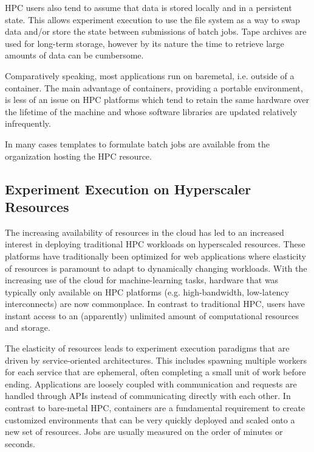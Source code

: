 \documentclass[utf8]{FrontiersinVancouver} %
\begin{document}
HPC users also tend to assume that data is stored locally and in a persistent state. This allows experiment execution to use the file system as a way to swap data and/or store the state between submissions of batch jobs. Tape archives are used for long-term storage, however by its nature the time to retrieve large amounts of data can be cumbersome.

Comparatively speaking, most applications run on baremetal, i.e. outside of a container. The main advantage of containers, providing a portable environment, is less of an issue on HPC platforms which tend to retain the same hardware over the lifetime of the machine and whose software libraries are updated relatively infrequently.

In many cases templates to formulate batch jobs are available from the organization hosting the HPC resource.

\subsection{Experiment Execution on Hyperscaler Resources}

The increasing availability of resources in the cloud has led to an increased interest in deploying traditional HPC workloads on hyperscaled resources. These platforms have traditionally been optimized for web applications where elasticity of resources is paramount to adapt to dynamically changing workloads.  With the increasing use of the cloud for machine-learning tasks, hardware that was typically only available on HPC platforms (e.g. high-bandwidth, low-latency interconnects) are now commonplace. In contrast to traditional HPC, users have instant access to an (apparently) unlimited amount of computational resources and storage.

The elasticity of resources leads to experiment execution paradigms that are driven by service-oriented architectures. This includes spawning multiple workers for each service that are ephemeral, often completing a small unit of work before ending. Applications are loosely coupled with communication and requests are handled through APIs instead of communicating directly with each other.  In contrast to bare-metal HPC, containers are a fundamental requirement to create customized environments that can be very quickly deployed and scaled onto a new set of resources. Jobs are usually measured on the order of minutes or seconds.
\end{document}
